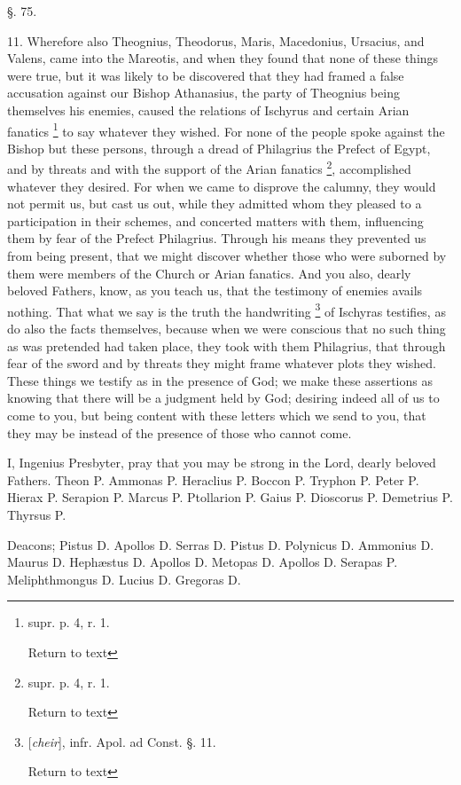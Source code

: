 §. 75.

11. Wherefore also Theognius, Theodorus, Maris,
Macedonius, Ursacius, and Valens, came into the Mareotis, and when
they found that none of these things were true, but it was likely to
be discovered that they had framed a false accusation against our
Bishop Athanasius, the party of Theognius being themselves his
enemies, caused the relations of Ischyrus and certain Arian fanatics \footnote{supr. p. 4, r. 1.

Return to text} to say whatever they wished. For none of the people spoke
against the Bishop but these persons, through a dread of Philagrius
the Prefect of Egypt, and by threats and with the support of the Arian
fanatics \footnote{supr. p. 4, r. 1.

Return to text}, accomplished whatever they
desired. For when we came to disprove the calumny, they would
not permit us, but cast us out, while they admitted whom they pleased
to a participation in their schemes, and concerted matters with them,
influencing them by fear of the Prefect Philagrius. Through his means
they prevented us from being present, that we might discover whether
those who were suborned by them were members of the Church or Arian
fanatics. And you also, dearly beloved Fathers, know, as you teach us,
that the testimony of enemies avails nothing. That what we say is the
truth the handwriting \footnote{[\emph{cheir}], infr. Apol. ad Const. §. 11.

Return to text}
of Ischyras testifies, as do also the facts themselves, because when
we were conscious that no such thing as was pretended had taken place,
they took with them Philagrius, that through fear of the sword and by
threats they might frame whatever plots they wished. These things we
testify as in the presence of God; we make these assertions as knowing
that there will be a judgment held by God; desiring indeed all of us
to come to you, but being content with these letters which we send to
you, that they may be instead of the presence of those who cannot
come.

I, Ingenius Presbyter, pray that you may be
strong in the Lord, dearly beloved Fathers. Theon P. Ammonas P.
Heraclius P. Boccon P. Tryphon P. Peter P. Hierax P. Serapion P.
Marcus P. Ptollarion P. Gaius P. Dioscorus P. Demetrius P. Thyrsus P.

Deacons; Pistus D. Apollos D. Serras D. Pistus D.
Polynicus D. Ammonius D. Maurus D. Hephæstus D. Apollos D. Metopas D.
Apollos D. Serapas P. Meliphthmongus D. Lucius D. Gregoras D.

